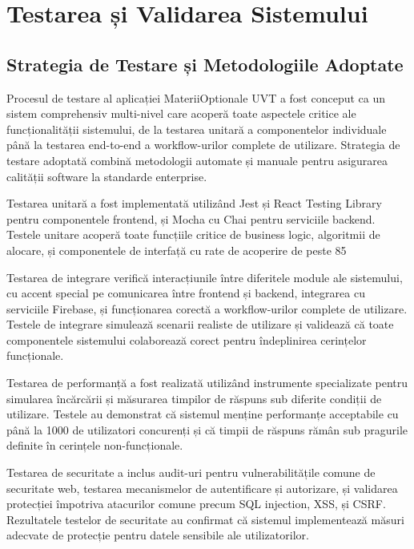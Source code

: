 \documentclass[12pt,a4paper]{report}
\begin{document}
\chapter{Testarea și Validarea Sistemului}

\section{Strategia de Testare și Metodologiile Adoptate}

Procesul de testare al aplicației MateriiOptionale UVT a fost conceput ca un sistem comprehensiv multi-nivel care acoperă toate aspectele critice ale funcționalității sistemului, de la testarea unitară a componentelor individuale până la testarea end-to-end a workflow-urilor complete de utilizare. Strategia de testare adoptată combină metodologii automate și manuale pentru asigurarea calității software la standarde enterprise.

Testarea unitară a fost implementată utilizând Jest și React Testing Library pentru componentele frontend, și Mocha cu Chai pentru serviciile backend. Testele unitare acoperă toate funcțiile critice de business logic, algoritmii de alocare, și componentele de interfață cu rate de acoperire de peste 85%

Testarea de integrare verifică interacțiunile între diferitele module ale sistemului, cu accent special pe comunicarea între frontend și backend, integrarea cu serviciile Firebase, și funcționarea corectă a workflow-urilor complete de utilizare. Testele de integrare simulează scenarii realiste de utilizare și validează că toate componentele sistemului colaborează corect pentru îndeplinirea cerințelor funcționale.

Testarea de performanță a fost realizată utilizând instrumente specializate pentru simularea încărcării și măsurarea timpilor de răspuns sub diferite condiții de utilizare. Testele au demonstrat că sistemul menține performanțe acceptabile cu până la 1000 de utilizatori concurenți și că timpii de răspuns rămân sub pragurile definite în cerințele non-funcționale.

Testarea de securitate a inclus audit-uri pentru vulnerabilitățile comune de securitate web, testarea mecanismelor de autentificare și autorizare, și validarea protecției împotriva atacurilor comune precum SQL injection, XSS, și CSRF. Rezultatele testelor de securitate au confirmat că sistemul implementează măsuri adecvate de protecție pentru datele sensibile ale utilizatorilor.
\end{document}
